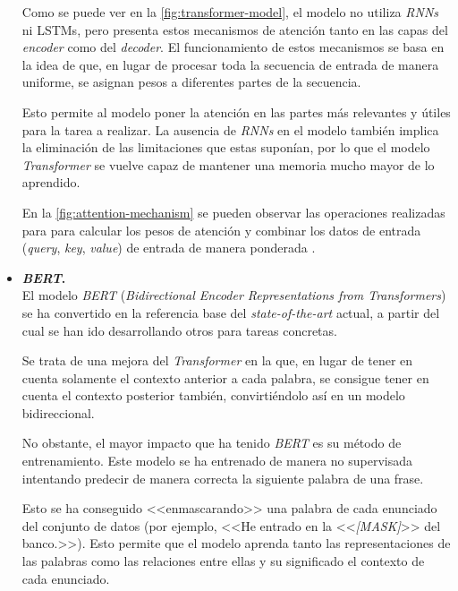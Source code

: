\begin{itemize}
    
    Como se puede ver en la \autoref{fig:transformer-model}, el modelo no utiliza \textit{RNNs} ni {LSTMs}, pero presenta estos mecanismos de atención tanto en las capas del \textit{encoder} como del \textit{decoder}. El funcionamiento de estos mecanismos se basa en la idea de que, en lugar de procesar toda la secuencia de entrada de manera uniforme, se asignan pesos a diferentes partes de la secuencia.
    
    Esto permite al modelo poner la atención en las partes más relevantes y útiles para la tarea a realizar. La ausencia de \textit{RNNs} en el modelo también implica la eliminación de las limitaciones que estas suponían, por lo que el modelo \textit{Transformer} se vuelve capaz de mantener una memoria mucho mayor de lo aprendido. 
    
    En la \autoref{fig:attention-mechanism} se pueden observar las operaciones realizadas para para calcular los pesos de atención y combinar los datos de entrada (\textit{query}, \textit{key}, \textit{value}) de entrada de manera ponderada .


    \item \textbf{\textit{BERT}.}\\
    El modelo \textit{BERT} (\textit{Bidirectional Encoder Representations from Transformers}) se ha convertido en la referencia base del \textit{state-of-the-art} actual, a partir del cual se han ido desarrollando otros para tareas concretas.
    
    Se trata de una mejora del \textit{Transformer} en la que, en lugar de tener en cuenta solamente el contexto anterior a cada palabra, se consigue tener en cuenta el contexto posterior también, convirtiéndolo así en un modelo bidireccional.

    No obstante, el mayor impacto que ha tenido \textit{BERT} es su método de entrenamiento. Este modelo se ha entrenado de manera no supervisada intentando predecir de manera correcta la siguiente palabra de una frase. 
    
    Esto se ha conseguido <<enmascarando>> una palabra de cada enunciado del conjunto de datos (por ejemplo, <<He entrado en la <<\textit{[MASK]}>> del banco.>>). Esto permite que el modelo aprenda tanto las representaciones de las palabras como las relaciones entre ellas y su significado el contexto de cada enunciado.


\end{itemize}

